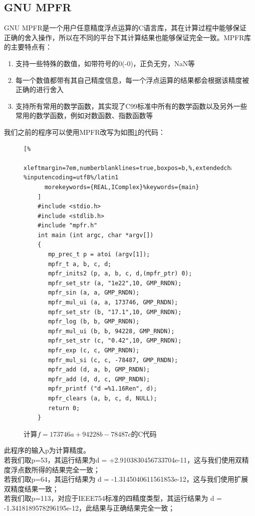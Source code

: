 \subsection{GNU MPFR}

GNU MPFR是一个用户任意精度浮点运算的C语言库，其在计算过程中能够保证正确的舍入操作，所以在不同的平台下其计算结果也能够保证完全一致。MPFR库的主要特点有：

\begin{enumerate}
\item 支持一些特殊的数值，如带符号的0(-0)，正负无穷，NaN等
\item 每一个数值都带有其自己精度信息，每一个浮点运算的结果都会根据该精度被正确的进行舍入
\item 支持所有常用的数学函数，其实现了C99标准中所有的数学函数以及另外一些常用的数学函数，例如对数函数、指数函数等
\end{enumerate}

我们之前的程序可以使用MPFR改写为如图\ref{lst:arbiexmpfrcode}的代码：

\begin{figure}[thbp]
    \begin{lstlisting}[%
      xleftmargin=7em,numberblanklines=true,boxpos=b,%,extendedchars=\true, %inputencoding=utf8%/latin1
      morekeywords={REAL,IComplex}%keywords={main}
    ]
    #include <stdio.h>
    #include <stdlib.h>
    #include "mpfr.h"
    int main (int argc, char *argv[])
    {
       mp_prec_t p = atoi (argv[1]);
       mpfr_t a, b, c, d;
       mpfr_inits2 (p, a, b, c, d,(mpfr_ptr) 0);
       mpfr_set_str (a, "1e22",10, GMP_RNDN);
       mpfr_sin (a, a, GMP_RNDN);
       mpfr_mul_ui (a, a, 173746, GMP_RNDN);
       mpfr_set_str (b, "17.1",10, GMP_RNDN);
       mpfr_log (b, b, GMP_RNDN);
       mpfr_mul_ui (b, b, 94228, GMP_RNDN);
       mpfr_set_str (c, "0.42",10, GMP_RNDN);
       mpfr_exp (c, c, GMP_RNDN);
       mpfr_mul_si (c, c, -78487, GMP_RNDN);
       mpfr_add (d, a, b, GMP_RNDN);
       mpfr_add (d, d, c, GMP_RNDN);
       mpfr_printf ("d =%1.16Ren", d);
       mpfr_clears (a, b, c, d, NULL);
       return 0;
    }
    \end{lstlisting}
    \caption{计算$f = 173746a + 94228b - 78487c$的C代码}
    \label{lst:arbiexmpfrcode}
\end{figure}

此程序的输入p为计算精度。\\
若我们取p=53，其运行结果为d = +2.9103830456733704e-11，这与我们使用双精度浮点数所得的结果完全一致；\\
若我们取p=64，其运行结果为 d = -1.3145040611561853e-12，这与我们使用扩展双精度结果一致；\\
若我们取p=113，对应于IEEE754标准的四精度类型，其运行结果为 d = -1.3418189578296195e-12，此结果与正确结果完全一致；

